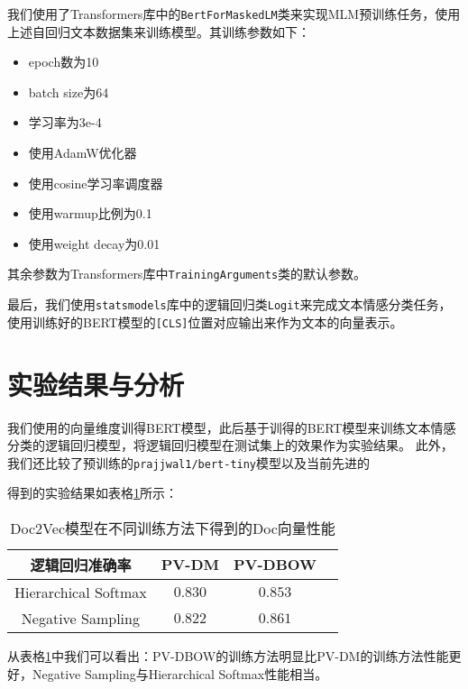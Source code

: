 \documentclass{article}
\begin{document}
我们使用了Transformers库中的\verb|BertForMaskedLM|类来实现MLM预训练任务，使用上述自回归文本数据集来训练模型。其训练参数如下：
\begin{itemize}
  \item epoch数为10
  \item batch size为64
  \item 学习率为3e-4
  \item 使用AdamW优化器
  \item 使用cosine学习率调度器
  \item 使用warmup比例为0.1
  \item 使用weight decay为0.01
\end{itemize}
其余参数为Transformers库中\verb|TrainingArguments|类的默认参数。

最后，我们使用\verb|statsmodels|库中的逻辑回归类\verb|Logit|来完成文本情感分类任务，
使用训练好的BERT模型的\verb|[CLS]|位置对应输出来作为文本的向量表示。



\section{实验结果与分析}

我们使用的向量维度训得BERT模型，此后基于训得的BERT模型来训练文本情感分类的逻辑回归模型，将逻辑回归模型在测试集上的效果作为实验结果。
此外，我们还比较了预训练的\verb|prajjwal1/bert-tiny|模型以及当前先进的

得到的实验结果如表格\ref{tab:results}所示：
\begin{table}[htbp]
  \caption{Doc2Vec模型在不同训练方法下得到的Doc向量性能}
  \label{tab:results}
  \vspace{5pt}
  \centering
  \begin{tabular}{cccc}
    \toprule
    逻辑回归准确率       & PV-DM   & PV-DBOW \\
    \midrule
    Hierarchical Softmax & $0.830$ & $0.853$ \\
    \midrule
    Negative Sampling    & $0.822$ & $0.861$ \\
    \bottomrule
  \end{tabular}
\end{table}

从表格\ref{tab:results}中我们可以看出：PV-DBOW的训练方法明显比PV-DM的训练方法性能更好，Negative Sampling与Hierarchical Softmax性能相当。





\end{document}
